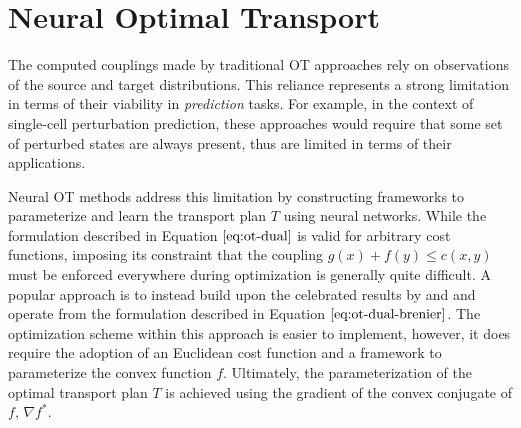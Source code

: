 \section{Neural Optimal Transport}
The computed couplings made by traditional OT approaches rely on observations of the source and target distributions.
This reliance represents a strong limitation in terms of their viability in \emph{prediction} tasks.
For example, in the context of single-cell perturbation prediction,
these approaches would require that some set of perturbed states are always present,
thus are limited in terms of their applications.

Neural OT methods address this limitation by constructing frameworks to parameterize and learn the transport plan $T$ using neural networks.
While the formulation described in Equation $\ref{eq:ot-dual}$ is valid for arbitrary cost functions,
imposing its constraint that the coupling $g(x) + f(y) \leq c(x, y)$ must be enforced everywhere during optimization is generally quite difficult.
A popular approach is to instead build upon the celebrated results by \citet{knott1984} and \citet{brenier1991}
and operate from the formulation described in Equation $\ref{eq:ot-dual-brenier}$.
The optimization scheme within this approach is easier to implement, however, it does require
the adoption of an Euclidean cost function and a framework to parameterize the convex function $f$.
Ultimately, the parameterization of the optimal transport plan $T$ is achieved using the gradient of the convex conjugate of $f$, $\nabla f^*$.

